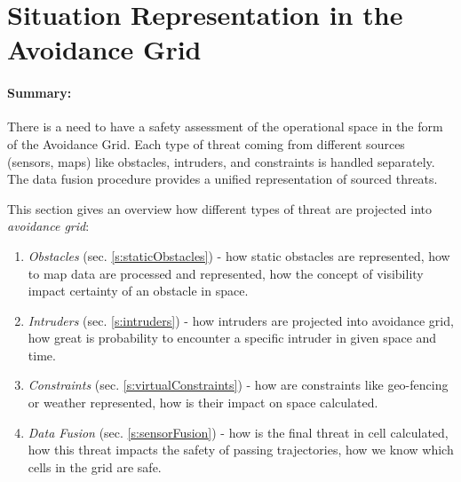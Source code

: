 \cleardoublepage
\section{Situation Representation in the Avoidance Grid}\label{sec:situationAssessment}

\paragraph{Summary:} There is a need to have a safety assessment of the operational space in the form of the Avoidance Grid. Each type of threat coming from different sources (sensors, maps) like obstacles, intruders, and constraints is handled separately. The data fusion procedure provides a unified representation of sourced threats.  

This section gives an overview how different types of threat are projected into \emph{avoidance grid}:

\begin{enumerate}
	\item\emph{Obstacles} (sec. \ref{s:staticObstacles}) - how static obstacles are represented, how to map data are processed and represented, how the concept of visibility impact certainty of an obstacle in space.
	
	\item\emph{Intruders} (sec. \ref{s:intruders}) - how intruders are projected into avoidance grid, how great is probability to encounter a specific intruder in given space and time.
	
	\item\emph{Constraints} (sec. \ref{s:virtualConstraints}) - how are constraints like geo-fencing or weather represented, how is their impact on space calculated.
	
	\item\emph{Data Fusion} (sec. \ref{s:sensorFusion}) - how is the final threat in cell calculated, how this threat impacts the safety of passing trajectories, how we know which cells in the grid are safe.
\end{enumerate}